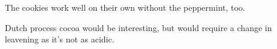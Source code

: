 \begin{variation}
\item The cookies work well on their own without the peppermint, too.
\end{variation}

\begin{experiments}
\item Dutch process cocoa would be interesting, but would require a change in leavening as it's not as acidic.
\end{experiments}

\recipeend
